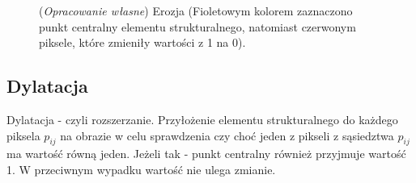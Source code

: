\documentclass{article}
\begin{document}
        \begin{figure}[H]
            \centering
            \qquad
            \qquad
            \caption
            {
                (\textit{Opracowanie własne}) Erozja (Fioletowym kolorem zaznaczono punkt centralny elementu strukturalnego, natomiast czerwonym piksele, które zmieniły wartości z 1 na 0).
            }
            \label{erozja}
        \end{figure}

        \subsection{Dylatacja}
        {
            \label{sec:dylatacja}
            \Large
            \justifying
            \quad
            Dylatacja - czyli rozszerzanie.
            Przyłożenie elementu strukturalnego do każdego piksela \(p_{ij}\) na obrazie w celu sprawdzenia czy choć jeden z pikseli z sąsiedztwa \(p_{ij}\) ma wartość równą jeden.
            Jeżeli tak - punkt centralny również przyjmuje wartość 1. W przeciwnym wypadku wartość nie ulega zmianie.
        }
\end{document}
